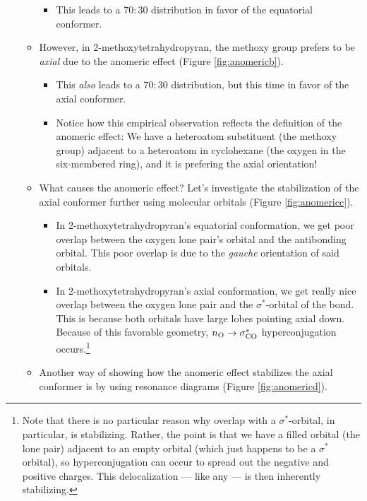 \documentclass[../notes.tex]{subfiles}
\begin{document}
\begin{itemize}
\begin{itemize}
        \begin{itemize}
            \item This leads to a $70:30$ distribution in favor of the equatorial conformer.
        \end{itemize}
        \item However, in 2-methoxytetrahydropyran, the methoxy group prefers to be \emph{axial} due to the anomeric effect (Figure \ref{fig:anomericb}).
        \begin{itemize}
            \item This \emph{also} leads to a $70:30$ distribution, but this time in favor of the axial conformer.
            \item Notice how this empirical observation reflects the definition of the anomeric effect: We have a heteroatom substituent (the methoxy group) adjacent to a heteroatom in cyclohexane (the oxygen in the six-membered ring), and it is prefering the axial orientation!
        \end{itemize}
        \item What causes the anomeric effect? Let's investigate the stabilization of the axial conformer further using molecular orbitals (Figure \ref{fig:anomericc}).
        \begin{itemize}
            \item In 2-methoxytetrahydropyran's equatorial conformation, we get poor overlap between the oxygen lone pair's orbital and the  antibonding orbital. This poor overlap is due to the \emph{gauche} orientation of said orbitals.
            \item In 2-methoxytetrahydropyran's axial conformation, we get really nice overlap between the oxygen lone pair and the $\sigma^*$-orbital of the  bond. This is because both orbitals have large lobes pointing axial down. Because of this favorable geometry, $n_{\ce{O}}\to\sigma_{\ce{CO}}^*$ hyperconjugation occurs.\footnote{Note that there is no particular reason why overlap with a $\sigma^*$-orbital, in particular, is stabilizing. Rather, the point is that we have a filled orbital (the lone pair) adjacent to an empty orbital (which just happens to be a $\sigma^*$ orbital), so hyperconjugation can occur to spread out the negative and positive charges. This delocalization --- like any --- is then inherently stabilizing.}
        \end{itemize}
        \item Another way of showing how the anomeric effect stabilizes the axial conformer is by using resonance diagrams (Figure \ref{fig:anomericd}).

\end{itemize}
\end{itemize}
\end{document}
